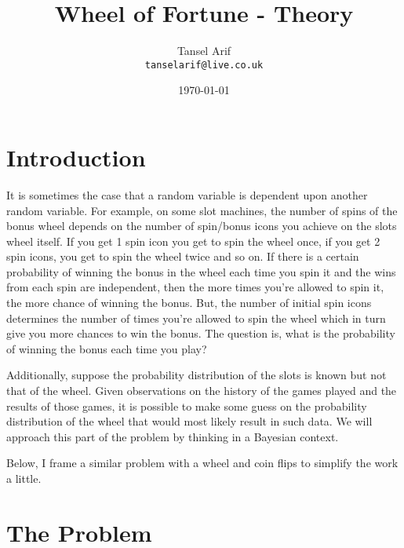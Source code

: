 \documentclass{article}
\title{Wheel of Fortune - Theory} %
\author{Tansel Arif\\ \texttt{tanselarif@live.co.uk}} %
\date{\today} %
\begin{document}
\maketitle %


\section*{Introduction} %

\begin{flushleft}
It is sometimes the case that a random variable is dependent upon another random variable. For example, on some slot machines, the number of spins of the bonus wheel depends on the number of spin/bonus icons you achieve on the slots wheel itself. If you get 1 spin icon you get to spin the wheel once, if you get 2 spin icons, you get to spin the wheel twice and so on. If there is a certain probability of winning the bonus in the wheel each time you spin it and the wins from each spin are independent, then the more times you're allowed to spin it, the more chance of winning the bonus. But, the number of initial spin icons determines the number of times you're allowed to spin the wheel which in turn give you more chances to win the bonus. The question is, what is the probability of winning the bonus each time you play?\newline

Additionally, suppose the probability distribution of the slots is known but not that of the wheel. Given observations on the history of the games played and the results of those games, it is possible to make some guess on the probability distribution of the wheel that would most likely result in such data. We will approach this part of the problem by thinking in a Bayesian context.\newline

Below, I frame a similar problem with a wheel and coin flips to simplify the work a little.
\end{flushleft}

\section{The Problem} %
\end{document}
